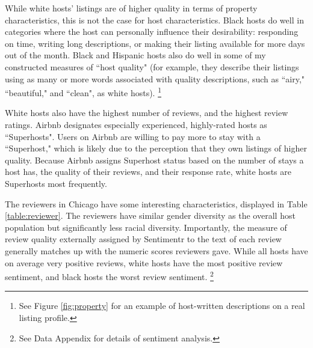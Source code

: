 While white hosts' listings are of higher quality in terms of property characteristics, this is not the case for host characteristics. Black hosts do well in categories where the host can personally influence their desirability: responding on time, writing long descriptions, or making their listing available for more days out of the month. %
Black and Hispanic hosts also do well in some of my constructed measures of ``host quality" (for example, they describe their listings using as many or more words associated with quality descriptions, such as ``airy," ``beautiful," and ``clean", as white hosts).%
	\footnote{See Figure \ref{fig:property} for an example of host-written descriptions on a real listing profile.} 
	

White hosts also have the highest number of reviews, and the highest review ratings. Airbnb designates especially experienced, highly-rated hosts as ``Superhosts". Users on Airbnb are willing to pay more to stay with a ``Superhost," which is likely due to the perception that they own listings of higher quality. Because Airbnb assigns Superhost status based on the number of stays a host has, the quality of their reviews, and their response rate, white hosts are Superhosts most frequently. %

The reviewers in Chicago have some interesting characteristics, displayed in Table \ref{table:reviewer}. The reviewers have similar gender diversity as the overall host population but significantly less racial diversity. Importantly, the measure of review quality externally assigned by Sentimentr to the text of each review generally matches up with the numeric scores reviewers gave. While all hosts have on average very positive reviews, white hosts have the most positive review sentiment, and black hosts the worst review sentiment.%
	\footnote{See Data Appendix for details of sentiment analysis. } 
